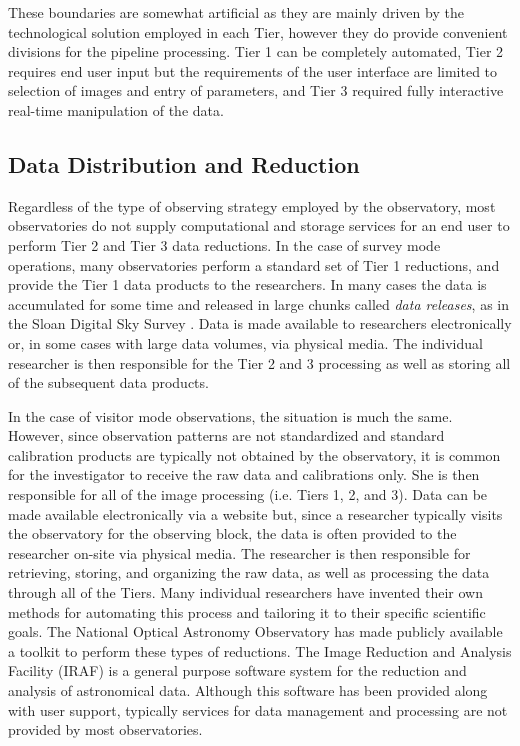 \documentclass[10pt,conference]{IEEEtran}
\begin{document}
These boundaries are somewhat artificial as they are mainly driven by the technological solution employed in each Tier, however they do provide convenient divisions for the pipeline processing. Tier 1 can be completely automated, Tier 2 requires end user input but the requirements of the user interface are limited to selection of images and entry of parameters, and Tier 3 required fully interactive real-time manipulation of the data. 

\subsection{Data Distribution and Reduction}\label{sec:reduction}

Regardless of the type of observing strategy employed by the observatory, most observatories do not supply computational and storage services for an end user to perform Tier 2 and Tier 3 data reductions. In the case of survey mode operations, many observatories perform a standard set of Tier 1 reductions, and provide the Tier 1 data products to the researchers. In many cases the data is accumulated for some time and released in large chunks called {\it data releases}, as in the Sloan Digital Sky Survey \cite{york2000}. Data is made available to researchers electronically or, in some cases with large data volumes, via physical media. The individual researcher is then responsible for the Tier 2 and 3 processing as well as storing all of the subsequent data products.

In the case of visitor mode observations, the situation is much the same. However, since observation patterns are not standardized and standard calibration products are typically not obtained by the observatory, it is common for the investigator to receive the raw data and calibrations only. She is then responsible for all of the image processing (i.e. Tiers 1, 2, and 3). Data can be made available electronically via a website but, since a researcher typically visits the observatory for the observing block, the data is often provided to the researcher on-site via physical media. The researcher is then responsible for retrieving, storing, and organizing the raw data, as well as processing the data through all of the Tiers. Many individual researchers have invented their own methods for automating this process and tailoring it to their specific scientific goals. The National Optical Astronomy Observatory has made publicly available a toolkit to perform these types of reductions. The Image Reduction and Analysis Facility (IRAF) is a general purpose software system for the reduction and analysis of astronomical data. Although this software has been provided along with user support, typically services for data management and processing are not provided by most observatories. 
\end{document}
